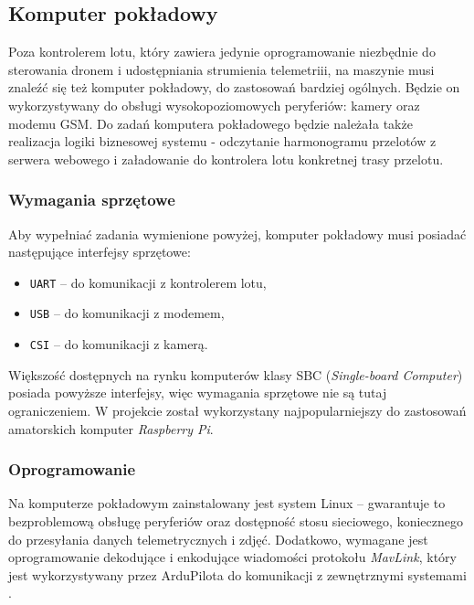 \subsection{Komputer pokładowy}

Poza kontrolerem lotu, który zawiera jedynie oprogramowanie 
niezbędnie do sterowania dronem i udostępniania
strumienia telemetriii, na maszynie musi znaleźć się też komputer pokładowy, 
do zastosowań bardziej ogólnych. Będzie on wykorzystywany do
obsługi wysokopoziomowych peryferiów: kamery oraz modemu GSM. Do zadań
komputera pokładowego będzie należała także realizacja logiki biznesowej systemu
- odczytanie harmonogramu przelotów z serwera webowego i załadowanie do kontrolera lotu
konkretnej trasy przelotu.

\subsubsection{Wymagania sprzętowe}

Aby wypełniać zadania wymienione powyżej, komputer pokładowy musi
posiadać następujące interfejsy sprzętowe:

\begin{itemize}
	\item \texttt{UART} -- do komunikacji z kontrolerem lotu,
	\item \texttt{USB} -- do komunikacji z modemem,
	\item \texttt{CSI} -- do komunikacji z kamerą.
\end{itemize}

Większość dostępnych na rynku komputerów klasy SBC (\textit{Single-board Computer})
posiada powyższe interfejsy, więc wymagania sprzętowe nie są tutaj ograniczeniem.
W projekcie został wykorzystany najpopularniejszy do zastosowań amatorskich
komputer \textit{Raspberry Pi}. 

\subsubsection{Oprogramowanie}

Na komputerze pokładowym zainstalowany jest system Linux -- gwarantuje to bezproblemową
obsługę peryferiów oraz dostępność stosu sieciowego, koniecznego do przesyłania 
danych telemetrycznych i zdjęć.
Dodatkowo, wymagane jest oprogramowanie dekodujące
i enkodujące wiadomości protokołu \textit{MavLink}, który jest wykorzystywany przez 
ArduPilota do komunikacji z zewnętrznymi systemami \cite{ardupilot_mavlink}.

